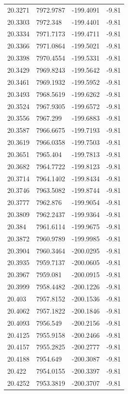 \begin{table}[H]
\begin{tabular}{llll}
20.3271 & 7972.9787 & -199.4091 & -9.81 \\
20.3303 & 7972.348 & -199.4401 & -9.81 \\
20.3334 & 7971.7173 & -199.4711 & -9.81 \\
20.3366 & 7971.0864 & -199.5021 & -9.81 \\
20.3398 & 7970.4554 & -199.5331 & -9.81 \\
20.3429 & 7969.8243 & -199.5642 & -9.81 \\
20.3461 & 7969.1932 & -199.5952 & -9.81 \\
20.3493 & 7968.5619 & -199.6262 & -9.81 \\
20.3524 & 7967.9305 & -199.6572 & -9.81 \\
20.3556 & 7967.299 & -199.6883 & -9.81 \\
20.3587 & 7966.6675 & -199.7193 & -9.81 \\
20.3619 & 7966.0358 & -199.7503 & -9.81 \\
20.3651 & 7965.404 & -199.7813 & -9.81 \\
20.3682 & 7964.7722 & -199.8123 & -9.81 \\
20.3714 & 7964.1402 & -199.8434 & -9.81 \\
20.3746 & 7963.5082 & -199.8744 & -9.81 \\
20.3777 & 7962.876 & -199.9054 & -9.81 \\
20.3809 & 7962.2437 & -199.9364 & -9.81 \\
20.384 & 7961.6114 & -199.9675 & -9.81 \\
20.3872 & 7960.9789 & -199.9985 & -9.81 \\
20.3904 & 7960.3464 & -200.0295 & -9.81 \\
20.3935 & 7959.7137 & -200.0605 & -9.81 \\
20.3967 & 7959.081 & -200.0915 & -9.81 \\
20.3999 & 7958.4482 & -200.1226 & -9.81 \\
20.403 & 7957.8152 & -200.1536 & -9.81 \\
20.4062 & 7957.1822 & -200.1846 & -9.81 \\
20.4093 & 7956.549 & -200.2156 & -9.81 \\
20.4125 & 7955.9158 & -200.2466 & -9.81 \\
20.4157 & 7955.2825 & -200.2777 & -9.81 \\
20.4188 & 7954.649 & -200.3087 & -9.81 \\
20.422 & 7954.0155 & -200.3397 & -9.81 \\
20.4252 & 7953.3819 & -200.3707 & -9.81 \\

\end{tabular}
\end{table}
